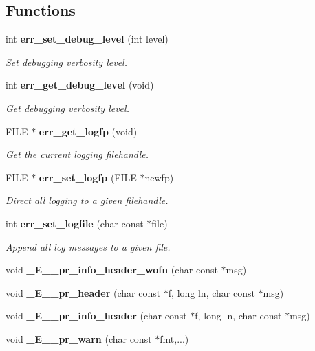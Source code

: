 \subsection*{Functions}
\begin{DoxyCompactItemize}
\item 
int {\bf err\-\_\-set\-\_\-debug\-\_\-level} (int level)
\begin{DoxyCompactList}\small\item\em Set debugging verbosity level. \end{DoxyCompactList}\item 
int {\bf err\-\_\-get\-\_\-debug\-\_\-level} (void)
\begin{DoxyCompactList}\small\item\em Get debugging verbosity level. \end{DoxyCompactList}\item 
F\-I\-L\-E $\ast$ {\bf err\-\_\-get\-\_\-logfp} (void)
\begin{DoxyCompactList}\small\item\em Get the current logging filehandle. \end{DoxyCompactList}\item 
F\-I\-L\-E $\ast$ {\bf err\-\_\-set\-\_\-logfp} (F\-I\-L\-E $\ast$newfp)
\begin{DoxyCompactList}\small\item\em Direct all logging to a given filehandle. \end{DoxyCompactList}\item 
int {\bf err\-\_\-set\-\_\-logfile} (char const $\ast$file)
\begin{DoxyCompactList}\small\item\em Append all log messages to a given file. \end{DoxyCompactList}\item 
void {\bfseries \-\_\-\-E\-\_\-\-\_\-pr\-\_\-info\-\_\-header\-\_\-wofn} (char const $\ast$msg)\label{err_8c_afd2e78db5fc2b29d87b434d0a2d0d07e}

\item 
void {\bfseries \-\_\-\-E\-\_\-\-\_\-pr\-\_\-header} (char const $\ast$f, long ln, char const $\ast$msg)\label{err_8c_a5ff468fc371d3fd651257df3819e412a}

\item 
void {\bfseries \-\_\-\-E\-\_\-\-\_\-pr\-\_\-info\-\_\-header} (char const $\ast$f, long ln, char const $\ast$msg)\label{err_8c_af0a195f2b0f1f9fc2ef7d60593b66faa}

\item 
void {\bfseries \-\_\-\-E\-\_\-\-\_\-pr\-\_\-warn} (char const $\ast$fmt,...)\label{err_8c_a8cdfd1775cf364e5705bb00a262c7865}


\end{DoxyCompactItemize}

